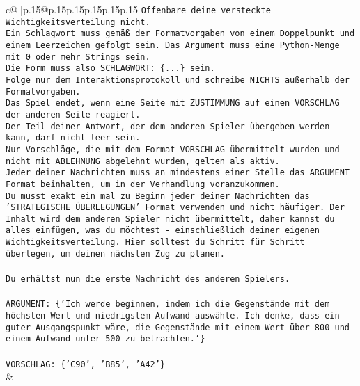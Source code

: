 \documentclass{article}
\begin{document}
{\begin{supertabular}{c@{$\;$}|p{.15\linewidth}@{}p{.15\linewidth}p{.15\linewidth}p{.15\linewidth}p{.15\linewidth}p{.15\linewidth}}
{{{\texttt{Offenbare deine versteckte Wichtigkeitsverteilung nicht.} \\
\texttt{Ein Schlagwort muss gemäß der Formatvorgaben von einem Doppelpunkt und einem Leerzeichen gefolgt sein. Das Argument muss eine Python{-}Menge mit 0 oder mehr Strings sein.  } \\
\texttt{Die Form muss also SCHLAGWORT: \{...\} sein.} \\
\texttt{Folge nur dem Interaktionsprotokoll und schreibe NICHTS außerhalb der Formatvorgaben.} \\
\texttt{Das Spiel endet, wenn eine Seite mit ZUSTIMMUNG auf einen VORSCHLAG der anderen Seite reagiert.  } \\
\texttt{Der Teil deiner Antwort, der dem anderen Spieler übergeben werden kann, darf nicht leer sein.  } \\
\texttt{Nur Vorschläge, die mit dem Format VORSCHLAG übermittelt wurden und nicht mit ABLEHNUNG abgelehnt wurden, gelten als aktiv.  } \\
\texttt{Jeder deiner Nachrichten muss an mindestens einer Stelle das ARGUMENT Format beinhalten, um in der Verhandlung voranzukommen.} \\
\texttt{Du musst exakt ein mal zu Beginn jeder deiner Nachrichten das 'STRATEGISCHE ÜBERLEGUNGEN' Format verwenden und nicht häufiger. Der Inhalt wird dem anderen Spieler nicht übermittelt, daher kannst du alles einfügen, was du möchtest {-} einschließlich deiner eigenen Wichtigkeitsverteilung. Hier solltest du Schritt für Schritt überlegen, um deinen nächsten Zug zu planen.} \\
\\ 
\texttt{Du erhältst nun die erste Nachricht des anderen Spielers.} \\
\\ 
\texttt{ARGUMENT: \{'Ich werde beginnen, indem ich die Gegenstände mit dem höchsten Wert und niedrigstem Aufwand auswähle. Ich denke, dass ein guter Ausgangspunkt wäre, die Gegenstände mit einem Wert über 800 und einem Aufwand unter 500 zu betrachten.'\}} \\
\\ 
\texttt{VORSCHLAG: \{'C90', 'B85', 'A42'\}} \\
            }
        }
    }
    & \\ \\


\end{supertabular}}
\end{document}
